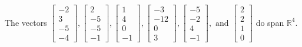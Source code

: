 \begin{exercise}
\begin{exerciseStatement}
  \end{exerciseStatement}
  \begin{exerciseAnswer}
   The vectors \(\left[\begin{array}{r}
-2 \\
3 \\
-5 \\
-4
\end{array}\right] , \left[\begin{array}{r}
2 \\
-5 \\
-5 \\
-1
\end{array}\right] , \left[\begin{array}{r}
1 \\
4 \\
0 \\
-1
\end{array}\right] , \left[\begin{array}{r}
-3 \\
-12 \\
0 \\
3
\end{array}\right] , \left[\begin{array}{r}
-5 \\
-2 \\
4 \\
-1
\end{array}\right] , \text{ and } \left[\begin{array}{r}
2 \\
2 \\
1 \\
0
\end{array}\right]\) 
  	 do  
	span \(\mathbb{R}^4\).
  


  \end{exerciseAnswer}
\end{exercise}